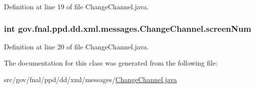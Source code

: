 Definition at line 19 of file Change\-Channel.\-java.

\hypertarget{classgov_1_1fnal_1_1ppd_1_1dd_1_1xml_1_1messages_1_1ChangeChannel_aa93c4b773d4d0fab155d8206d4d385ff}{
\subsubsection[{screen\-Num}]{\setlength{\rightskip}{0pt plus 5cm}int gov.\-fnal.\-ppd.\-dd.\-xml.\-messages.\-Change\-Channel.\-screen\-Num\hspace{0.3cm}{\ttfamily [protected]}}}\label{classgov_1_1fnal_1_1ppd_1_1dd_1_1xml_1_1messages_1_1ChangeChannel_aa93c4b773d4d0fab155d8206d4d385ff}


Definition at line 20 of file Change\-Channel.\-java.



The documentation for this class was generated from the following file\-:\begin{DoxyCompactItemize}
\item 
src/gov/fnal/ppd/dd/xml/messages/\hyperlink{ChangeChannel_8java}{Change\-Channel.\-java}\end{DoxyCompactItemize}
